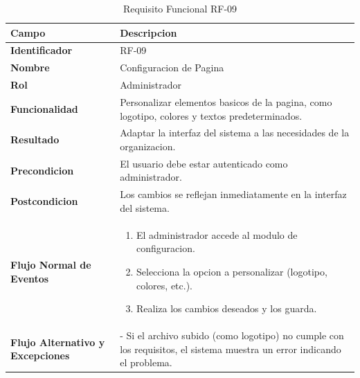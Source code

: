 \begin{table}[htb!]
\centering
\caption{Requisito Funcional RF-09}
\begin{tabular}{|p{3cm}|p{12cm}|}
\hline
\textbf{Campo} & \textbf{Descripcion} \\ \hline
\textbf{Identificador} & RF-09 \\ \hline
\textbf{Nombre} & Configuracion de Pagina \\ \hline
\textbf{Rol} & Administrador \\ \hline
\textbf{Funcionalidad} & Personalizar elementos basicos de la pagina, como logotipo, colores y textos predeterminados. \\ \hline
\textbf{Resultado} & Adaptar la interfaz del sistema a las necesidades de la organizacion. \\ \hline
\textbf{Precondicion} & El usuario debe estar autenticado como administrador. \\ \hline
\textbf{Postcondicion} & Los cambios se reflejan inmediatamente en la interfaz del sistema. \\ \hline
\textbf{Flujo Normal de Eventos} & 
\begin{enumerate}
    \item El administrador accede al modulo de configuracion. 
    \item Selecciona la opcion a personalizar (logotipo, colores, etc.). 
    \item Realiza los cambios deseados y los guarda. 
    
\end{enumerate}
\\ \hline
\textbf{Flujo Alternativo y Excepciones} & 
- Si el archivo subido (como logotipo) no cumple con los requisitos, el sistema muestra un error indicando el problema. \\ \hline
\end{tabular}
\end{table}
\FloatBarrier

